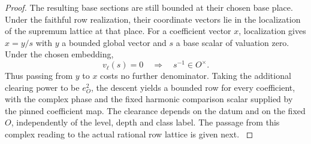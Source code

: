 \begin{proof}
The resulting base sections are still bounded at their
chosen base place. Under the faithful row realization,
their coordinate vectors lie in the localization of the
supremum lattice at that place. For a coefficient vector \(x\), localization gives \(x=y/s\) with \(y\) a bounded global vector and \(s\) a base scalar of valuation zero. Under the chosen embedding,
\[
 v_\ell(s)=0\quad\Longrightarrow\quad s^{-1}\in O^\times.
\]
Thus passing from \(y\) to \(x\) costs no further denominator. Taking the additional clearing power to be
\(e_O^2\), the descent yields a bounded row for every
coefficient, with the complex phase and the fixed
harmonic comparison scalar supplied by the pinned
coefficient map. The clearance depends on the datum
and on the fixed \(O\), independently of the level,
depth and class label. The passage from this complex
reading to the actual rational row lattice is given next.
\label{cor:theta-cover-integrality-4}
\end{proof}
